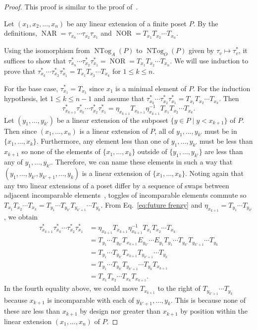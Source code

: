 \documentclass[ALCO,ThmDefs,Unicode,epreuves]{cedram}
\DeclareMathOperator{\ntog}{NTog}
\DeclareMathOperator{\NAR}{NAR}
\DeclareMathOperator{\NOR}{NOR}
\begin{document}
\begin{proof}
This proof is similar to the proof
of~\cite[Theorem 3.21]{antichain-toggling}.

Let $(x_1,x_2,\dots,x_n)$ be any linear extension of a finite poset $P$. By the definitions,
$\NAR=\tau_{x_n}\cdots \tau_{x_2}\tau_{x_1}$
and
$\NOR=T_{x_1} T_{x_2} \cdots T_{x_n}$.

Using the isomorphism from $\ntog_A(P)$ to $\ntog_O(P)$ given by $\tau_v \mapsto \tau_v^*$,
it suffices to show that
$\tau_{x_n}^*\cdots \tau_{x_2}^* \tau_{x_1}^*=\NOR = T_{x_1} T_{x_2} \cdots T_{x_n}$.
We will use induction to prove that $\tau_{x_k}^*\cdots \tau_{x_2}^* \tau_{x_1}^*
=T_{x_1} T_{x_2} \cdots T_{x_k}$ for $1\leq k\leq n$.

For the base case, $\tau_{x_1}^*=T_{x_1}$ since $x_1$ is a minimal element of $P$.
For the induction hypothesis, let $1\leq k\leq n-1$ and assume that
$\tau_{x_k}^*\cdots \tau_{x_2}^* \tau_{x_1}^*
=T_{x_1} T_{x_2} \cdots T_{x_k}$.
Then 
\begin{equation}\label{eq:future frenzy}
\tau_{x_{k+1}}^*\tau_{x_k}^*\cdots \tau_{x_2}^* \tau_{x_1}^*
= \eta_{x_{k+1}} T_{x_{k+1}} \eta_{x_{k+1}}^{-1} T_{x_1} T_{x_2} \cdots T_{x_k}.
\end{equation}
Let $(y_1,\dots,y_{k'})$ be a linear extension of the subposet $\{y\in P \;|\; y<x_{k+1}\}$ of $P$.
Then since $(x_1,\dots,x_n)$ is a linear extension of $P$, all of $y_1,\dots,y_{k'}$ must be in $\{x_1,\dots,x_k\}$.
Furthermore, any element less than one of $y_1,\dots,y_{k'}$ must be less than $x_{k+1}$ so none of the elements of $\{x_1,\dots,x_k\}$ outside of $\{y_1,\dots,y_{k'}\}$ are less than any of $y_1,\dots,y_{k'}$.
Therefore, we can name these elements in such a way that $(y_1,\dots,y_{k'}, y_{k'+1}, \dots, y_k)$ is a linear extension of $\{x_1,\dots,x_k\}$.
Noting again that any two linear extensions of a poset differ by a sequence of swaps between
adjacent incomparable elements~\cite{etienne-84}, 
toggles of incomparable elements commute so $T_{x_1}T_{x_2}\cdots T_{x_k} = T_{y_1}\cdots T_{y_{k'}}T_{y_{k'+1}}\cdots T_{y_k}$.
From Eq.~\eqref{eq:future frenzy} and $\eta_{x_{k+1}}=T_{y_1}\cdots T_{y_{k'}}$, we obtain
\begin{align*}
\tau_{x_{k+1}}^*\tau_{x_k}^*\cdots \tau_{x_2}^* \tau_{x_1}^* &=
\eta_{x_{k+1}} T_{x_{k+1}} \eta_{x_{k+1}}^{-1}
T_{x_1} T_{x_2} \cdots T_{x_k}
\\&=
T_{y_1}\cdots T_{y_{k'}} T_{x_{k+1}} E_{y_{k'}}\cdots E_{y_1} T_{y_1}\cdots T_{y_{k'}}T_{y_{k'+1}}\cdots T_{y_k}
\\&=
T_{y_1}\cdots T_{y_{k'}} T_{x_{k+1}} T_{y_{k'+1}}\cdots T_{y_k}
\\&=
T_{y_1}\cdots T_{y_{k'}} T_{y_{k'+1}}\cdots T_{y_k} T_{x_{k+1}}
\\&=
T_{x_1} T_{x_2} \cdots T_{x_k} T_{x_{k+1}}.
\end{align*}
In the fourth equality above, we could move $T_{x_{k+1}}$ to the right of $T_{y_{k'+1}}\cdots T_{y_k}$ because $x_{k+1}$ is incomparable with each of $y_{k'+1},\dots, y_k$. This is because none of these are less than $x_{k+1}$ by design nor greater than $x_{k+1}$ by position within the linear extension $(x_1,\dots,x_n)$ of $P$.


\end{proof}
\end{document}
